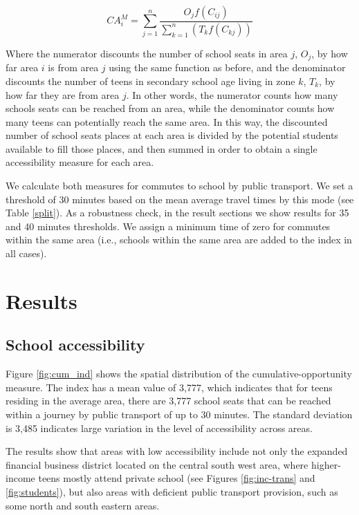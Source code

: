 \documentclass[3p,authoryear,preprint,review,12pt]{elsarticle}
\begin{document}
\[ CA_{i}^M= \sum_{j=1}^n\frac{O_{j}f(C_{ij})}{\sum_{k=1}^n(T_{k}f(C_{kj}))}\]

Where the numerator discounts the number of school seats in area \(j\), \(O_{j}\), by how far area \(i\) is from area \(j\) using the same function as before, and the denominator discounts the number of teens in secondary school age living in zone \(k\), \(T_{k}\), by how far they are from area \(j\). In other words, the numerator counts how many schools seats can be reached from an area, while the denominator counts how many teens can potentially reach the same area. In this way, the discounted number of school seats places at each area is divided by the potential students available to fill those places, and then summed in order to obtain a single accessibility measure for each area.

We calculate both measures for commutes to school by public transport. We set a threshold of 30 minutes based on the mean average travel times by this mode (see Table \ref{split}). As a robustness check, in the result sections we show results for 35 and 40 minutes thresholds. We assign a minimum time of zero for commutes within the same area (i.e., schools within the same area are added to the index in all cases).

\section{Results}\label{results}

\subsection{School accessibility}\label{results}

Figure \ref{fig:cum_ind} shows the spatial distribution of the cumulative-opportunity measure. The index has a mean value of 3,777, which indicates that for teens residing in the average area, there are 3,777 school seats that can be reached within a journey by public transport of up to 30 minutes. The standard deviation is 3,485 indicates large variation in the level of accessibility across areas.

The results show that areas with low accessibility include not
only the expanded financial business district located on the central
south west area, where higher-income teens mostly attend private school (see Figures \ref{fig:inc-trans} and \ref{fig:students}), but also areas with deficient public transport provision, such as some north and south eastern areas.
\end{document}
